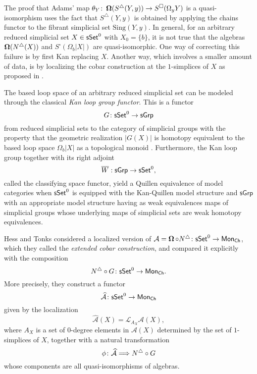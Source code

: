 The proof that Adams’ map $\theta_Y \colon \operatorname{\mathbf{\Omega}}(S^\triangle(Y, y)) \to S^{\square}(\Omega_y Y)$ is a quasi-isomorphism uses the fact that $S^\triangle(Y, y)$ is obtained by applying the chains functor to the fibrant simplicial set $\text{Sing}(Y,y)$. In general, for an arbitrary reduced simplicial set $X \in \mathsf{sSet}^0$ with $X_0=\{b\}$,  it is not true that the algebras
$\operatorname{\mathbf{\Omega}}(N^{\triangle}(X))$ and $S^{\square}(\Omega_b |X|)$ are quasi-isomorphic. One way of correcting this failure is by first Kan replacing $X$. Another way, which involves a smaller amount of data, is by localizing the cobar construction at the $1$-simplices of $X$ as proposed in \cite{hess2010cobar}.

The based loop space of an arbitrary reduced simplicial set can be modeled through the classical \textit{Kan loop group functor}. This is a functor 
$$G\colon \mathsf{sSet}^0 \to \mathsf{sGrp}$$ from reduced simplicial sets to the category of simplicial groups with the property that the geometric realization $|G(X)|$ is homotopy equivalent to the based loop space $\Omega_b|X|$ as a topological monoid \cite{berger1995loops}. Furthermore, the Kan loop group together with its right adjoint $$\overline{W}: \mathsf{sGrp} \to \mathsf{sSet}^0,$$ called the classifying space functor, yield a Quillen equivalence of model categories when $\mathsf{sSet}^0$ is equipped with the Kan-Quillen model structure and $\mathsf{sGrp}$ with an appropriate model structure having as weak equivalences maps of simplicial groups whose underlying maps of simplicial sets are weak homotopy equivalences. 

Hess and Tonks considered a localized version of $\mathcal{A} = \operatorname{\mathbf{\Omega}} \circ N^{\triangle} \colon \mathsf{sSet}^0 \to \mathsf{Mon}_{\mathsf{Ch}}$, which they called the \textit{extended cobar construction}, and compared it explicitly with the composition $$N^{\triangle} \circ G \colon \mathsf{sSet}^0 \to \mathsf{Mon}_{\mathsf{Ch}}.$$ More precisely, they construct a functor
$$\widehat{\mathcal{A}} \colon \mathsf{sSet}^0 \to \mathsf{Mon}_{\mathsf{Ch}}$$
given by the localization $$\widehat{\mathcal{A}}(X)= \mathcal{L}_{A_X} \mathcal{A}(X),$$
where $A_X$ is a set of $0$-degree elements in $\mathcal{A}(X)$ determined by the set of $1$-simplices of $X$, together with a natural transformation
$$\phi \colon \widehat{\mathcal{A}} \Longrightarrow N^{\triangle} \circ G$$  whose components are all quasi-isomorphisms of algebras.


